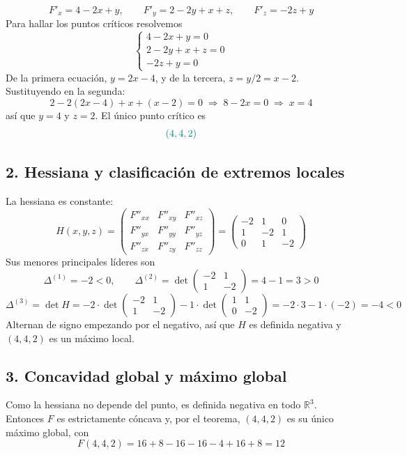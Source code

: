 \documentclass{article}
\newcommand{\R}{\ensuremath{\mathbb{R}}}
\begin{document}
\[
F'_x=4-2x+y,\qquad F'_y=2-2y+x+z,\qquad F'_z=-2z+y
\]
Para hallar los puntos críticos resolvemos
\[
\begin{cases}
4-2x+y=0\\[6pt]
2-2y+x+z=0\\[6pt]
-2z+y=0
\end{cases}
\]
De la primera ecuación, \(y=2x-4\), y de la tercera, \(z=y/2=x-2\). Sustituyendo en la segunda:
\[
2-2(2x-4)+x+(x-2)=0\;\Longrightarrow\;8-2x=0\;\Longrightarrow\;x=4
\]
así que \(y=4\) y \(z=2\). El único punto crítico es
\[\color{teal}
(4,4,2)
\]

\subsection*{2. Hessiana y clasificación de extremos locales}

La hessiana es constante:
\[
H(x,y,z)=
\begin{pmatrix}
F''_{xx}&F''_{xy}&F''_{xz}\\[4pt]
F''_{yx}&F''_{yy}&F''_{yz}\\[4pt]
F''_{zx}&F''_{zy}&F''_{zz}
\end{pmatrix}
=
\begin{pmatrix}
-2&1&0\\[4pt]
1&-2&1\\[4pt]
0&1&-2
\end{pmatrix}
\]
Sus menores principales líderes son
\[
\Delta^{(1)}=-2<0,\qquad
\Delta^{(2)}=\det\begin{pmatrix}-2&1\\[4pt]1&-2\end{pmatrix}=4-1=3>0
\]
\[
\Delta^{(3)}=\det H=-2\cdot\det\begin{pmatrix}-2&1\\[4pt]1&-2\end{pmatrix}-1\cdot\det\begin{pmatrix}1&1\\[4pt]0&-2\end{pmatrix}=-2\cdot3-1\cdot(-2)=-4<0
\]
Alternan de signo empezando por el negativo, así que \(H\) es definida negativa y \((4,4,2)\) es un máximo local.

\subsection*{3. Concavidad global y máximo global}

Como la hessiana no depende del punto, es definida negativa en todo \(\R^3\). Entonces \(F\) es estrictamente cóncava y, por el teorema, \((4,4,2)\) es su único máximo global, con
\[
F(4,4,2)=16+8-16-16-4+16+8=12
\]
\end{document}
